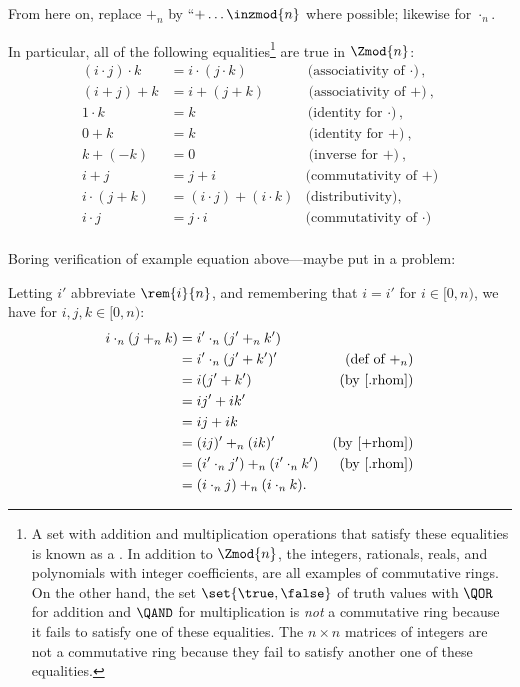 \begin{editingnotes}
From here on, replace $+_n$ by ``$+ \dots \inzmod{n}$ where
possible; likewise for $\cdot_n$.
\end{editingnotes}

In particular, all of the following equalities\footnote{A set with
  addition and multiplication operations that satisfy these equalities
  is known as a .  In addition to $\Zmod{n}$,
  the integers, rationals, reals, and polynomials with integer
  coefficients, are all examples of commutative rings.  On the other
  hand, the set $\set{\true, \false}$ of truth values with $\QOR$ for
  addition and $\QAND$ for multiplication is \emph{not} a commutative
  ring because it fails to satisfy one of these equalities.  The $n
  \times n$ matrices of integers are not a commutative ring because
  they fail to satisfy another one of these equalities.} are true in
$\Zmod{n}$:
\begin{align*}
(i \cdot j) \cdot k & = i \cdot (j \cdot k) 
       & \text{(associativity of $\cdot$)},\\
        (i + j) + k & = i + (j + k)  
       & \text{(associativity of $+$)},\\
           1 \cdot k  & = k  
       & \text{(identity for $\cdot$)},\\
              0 + k  & = k  
       & \text{(identity for $+$)},\\
           k + (-k)  & = 0  
       & \text{(inverse for $+$)},\\
                i + j & = j + i  
       & \text{(commutativity of $+$)}\\
    i \cdot (j + k) & = (i \cdot j) + (i \cdot k)  
       & \text{(distributivity)},\\
            i \cdot j & = j \cdot i  
       & \text{(commutativity of $\cdot$)}\\
\end{align*}

\begin{editingnotes}
Boring verification of example equation above---maybe put in a problem:

Letting $i'$ abbreviate $\rem{i}{n}$, and remembering that $i = i'$
for $i \in [0,n)$, we have for $i,j,k \in [0,n)$:
\begin{align*}
i \cdot_n (j +_n k) & = i' \cdot_n (j' +_n k')\\
   & = i' \cdot_n (j' + k')' & \text{(def of $+_n$)}\\
   & = i (j' + k') & \text{(by~\eqref{.rhom})}\\  %
   & = i j' + i k'\\
   & = ij + ik\\
   & = (ij)' +_n (ik)' & \text{(by~\eqref{+rhom})}\\  %
   & = (i' \cdot_ n j') +_n (i' \cdot_ n k') & \text{(by~\eqref{.rhom})}\\
   & = (i \cdot_ n j) +_n (i \cdot_ n k).
\end{align*}
\end{editingnotes}

